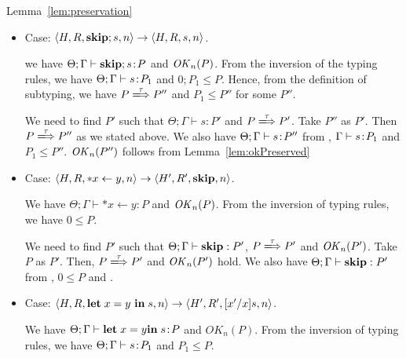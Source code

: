 \begin{pfof}{Lemma~\ref{lem:preservation}}
\begin{itemize}
We need to find \(P'\) and \(\Gamma'\) such that \(\Theta; \Gamma'
\vdash [x'/x]s\COL P'\) and \(P\xLongrightarrow{\Malloc} P'\). Take
\(P''\) as \(P'\) and \([x'/x]\Gamma\) as \(\Gamma'\).  (Note that
\([x'/x]\Gamma\) is well-formed because \(x'\) is fresh.)  Then \(P
\xLongrightarrow{\Malloc} P''\) as we state above. We also have
\(\Theta;[x'/x]\Gamma \vdash [x'/x]s \COL P''\) from ,
\(\Theta;[x'/x]\Gamma \vdash [x'/x]s \COL P_1\), and \(P_1 \le P''\).
\(\OK_{n-1}(P'')\) follows from Lemma~\ref{lem:okPreserved}.

\item Case: $\langle H, R, \mathbf{skip};s, n \rangle \rightarrow \langle
  H, R, s, n \rangle $.

  we have \(\Theta;\Gamma \vdash \mathbf{skip};s\!:\!  P\) and
  \(\mathit{OK}_{n}(P)\). From the inversion of the typing rules, we have
  \(\Theta; \Gamma \vdash s\!:\! P_{1}\) and \(0;P_{1} \le
  P\). Hence, from the definition of subtyping, we have \(P
  \xLongrightarrow{\tau} P''\) and \(P_{1} \le P''\) for some \(P''\).

  We need to find \(P'\) such that \(\Theta; \Gamma \vdash s : P'\)
  and \(P \xLongrightarrow{\tau} P'\). Take \(P''\) as \(P'\). Then \(P
  \xLongrightarrow{\tau} P''\) as we stated above. We also have
  \(\Theta;\Gamma \vdash s\!:\! P''\) from , \(\Gamma \vdash
  s\!:\! P_{1}\) and \(P_{1} \le P''\). \(\mathit{OK}_n(P'')\) follows from
  Lemma~\ref{lem:okPreserved}

\item Case: $\langle H, R, *x \leftarrow y , n \rangle \rightarrow
  \langle H', R', \mathbf{skip}, n \rangle $.

  We have \(\Theta; \Gamma \vdash *x \leftarrow y : P\) and
  \(\mathit{OK}_{n}(P)\). From the inversion of typing rules, we have \(0 \le
  P\).

  We need to find $P'$ such that \(\Theta; \Gamma \vdash \mathbf{skip}: P'\),
  \(P \xLongrightarrow{\tau} P'\) and \(\mathit{OK}_n(P')\). Take $P$ as $P'$. Then,
  \(P \xLongrightarrow{\tau} P'\) and \(\mathit{OK}_n(P')\) hold. We also have \(\Theta;
  \Gamma \vdash \mathbf{skip}: P'\) from , \(0 \le P\) and
  .

\item Case: $\langle H, R, \mathbf{let}\; x = y\ \mathbf{in}\; s , n \rangle
  \rightarrow \langle H', R', [x'/x]s, n \rangle $.

  We have \(\Theta; \Gamma \vdash \mathbf{let}\; x = y \mathbf{in}\; s \!:\! P\) and
  \(OK_{n}(P)\). From the inversion of typing rules, we have \(\Theta;
  \Gamma \vdash s\!:\! P_{1}\) and \(P_{1} \le P\).


\end{itemize}
\end{pfof}
